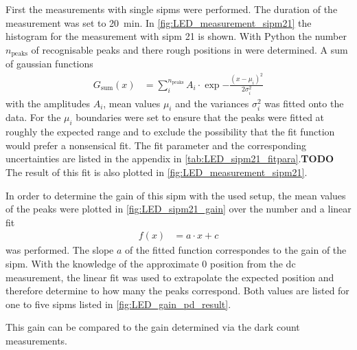 First the measurements with single \ac{sipm}s were performed. 
The duration of the measurement was set to \SI{20}{\minute}.
In \autoref{fig:LED_measurement_sipm21} the histogram for the measurement with \ac{sipm} 21 is shown.
With Python the number $n_\text{peaks}$ of recognisable peaks and there rough positions in \si{\adcu} were determined.
A sum of gaussian functions
\begin{align}
	G_\text{sum}(x) &= \sum_{i}^{n_\text{peaks}}A_i\cdot\exp{-\frac{(x-\mu_i)^2}{2\sigma_i^2}}
\end{align}
with the amplitudes $A_i$, mean values $\mu_i$ and the variances $\sigma_i^2$ was fitted onto the data.
For the $\mu_i$ boundaries were set to ensure that the peaks were fitted at roughly the expected \si{\adcu} range and to exclude the possibility that the fit function would prefer a nonsensical fit.
The fit parameter and the corresponding uncertainties are listed in the appendix in \autoref{tab:LED_sipm21_fitpara}.\textbf{TODO}
The result of this fit is also plotted in \autoref{fig:LED_measurement_sipm21}.

In order to determine the gain of this \ac{sipm} with the used setup, the mean values of the peaks were plotted in \autoref{fig:LED_sipm21_gain} over the \si{\pe} number and a linear fit 
\begin{align}
	f(x)&=a\cdot x +c 
\end{align}
was performed.
The slope $a$ of the fitted function correspondes to the gain of the \ac{sipm}.
With the knowledge of the approximate \SI{0}{\pe} position from the \ac{dc} measurement, the linear fit was used to extrapolate the expected position and therefore determine to how many \si{\pe} the peaks correspond.
Both values are listed for one to five \acp{sipm} listed in \autoref{fig:LED_gain_pd_result}.

This gain can be compared to the gain determined via the dark count measurements.

